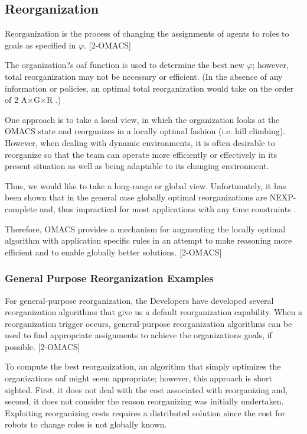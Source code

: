 \subsection{ Reorganization }
Reorganization is the process of changing the assignments of agents to roles to goals as specified
in $\varphi$.  [2-OMACS]

The organization?s oaf function is used to determine the best new $\varphi$; however, total
reorganization may not be necessary or efficient. (In the absence of any information or policies,
an optimal total reorganization would take on the order of 2 A$\times$G$\times$R .)

One approach is to take a local view, in which the organization looks at the OMACS state and
reorganizes in a locally optimal fashion (i.e. hill climbing).
However, when dealing with dynamic environments, it is often desirable to reorganize so that 
the team can operate more efficiently or
effectively in its present situation as well as being adaptable to its changing environment. 

Thus, we would like to take a long-range or global view. Unfortunately, it has been shown that in the
general case globally optimal reorganizations are NEXP-complete and, thus impractical for most
applications with any time constraints . 

Therefore, OMACS provides a mechanism for augmenting the locally optimal algorithm with application specific rules in an attempt to make
reasoning more efficient and to enable globally better solutions.
[2-OMACS]
\subsubsection{ General Purpose Reorganization Examples }

For general-purpose reorganization, the Developers have developed several reorganization algorithms that
give us a default reorganization capability. When a reorganization trigger occurs, general-purpose
reorganization algorithms can be used to find appropriate assignments to achieve the
organizations goals, if possible. [2-OMACS]

To compute the best reorganization, an algorithm that simply
optimizes the organizations oaf might seem appropriate; however, this approach is short sighted.
First, it does not deal with the cost associated with reorganizing and, second, it does not consider
the reason reorganizing was initially undertaken. Exploiting reorganizing costs requires a
distributed solution since the cost for robots to change roles is not globally known. 

